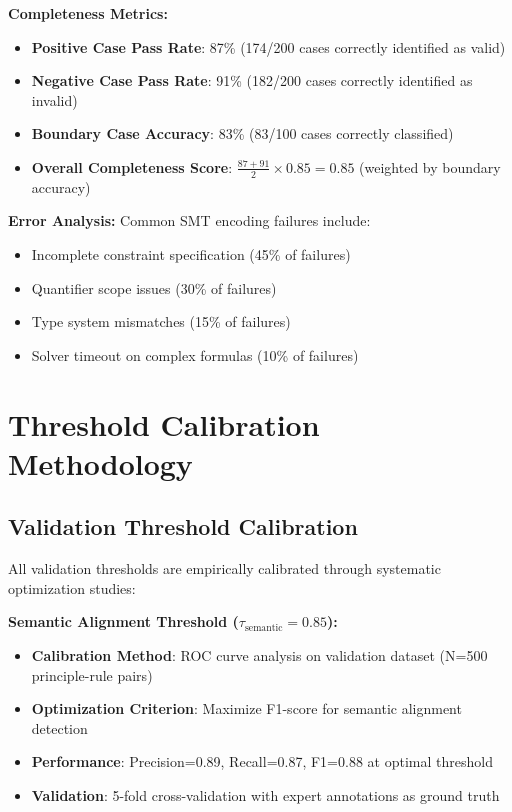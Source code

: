 \documentclass[sigconf,natbib]{acmart}
\begin{document}
\textbf{Completeness Metrics:}
\begin{itemize}
    \item \textbf{Positive Case Pass Rate}: 87\% (174/200 cases correctly identified as valid)
    \item \textbf{Negative Case Pass Rate}: 91\% (182/200 cases correctly identified as invalid)
    \item \textbf{Boundary Case Accuracy}: 83\% (83/100 cases correctly classified)
    \item \textbf{Overall Completeness Score}: $\frac{87 + 91}{2} \times 0.85 = 0.85$ (weighted by boundary accuracy)
\end{itemize}

\textbf{Error Analysis:}
Common SMT encoding failures include:
\begin{itemize}
    \item Incomplete constraint specification (45\% of failures)
    \item Quantifier scope issues (30\% of failures)
    \item Type system mismatches (15\% of failures)
    \item Solver timeout on complex formulas (10\% of failures)
\end{itemize}

\section{Threshold Calibration Methodology}
\label{app:threshold_calibration}

\subsection{Validation Threshold Calibration}
All validation thresholds are empirically calibrated through systematic optimization studies:

\textbf{Semantic Alignment Threshold ($\tau_{\text{semantic}} = 0.85$):}
\begin{itemize}
    \item \textbf{Calibration Method}: ROC curve analysis on validation dataset (N=500 principle-rule pairs)
    \item \textbf{Optimization Criterion}: Maximize F1-score for semantic alignment detection
    \item \textbf{Performance}: Precision=0.89, Recall=0.87, F1=0.88 at optimal threshold
    \item \textbf{Validation}: 5-fold cross-validation with expert annotations as ground truth
\end{itemize}
\end{document}
